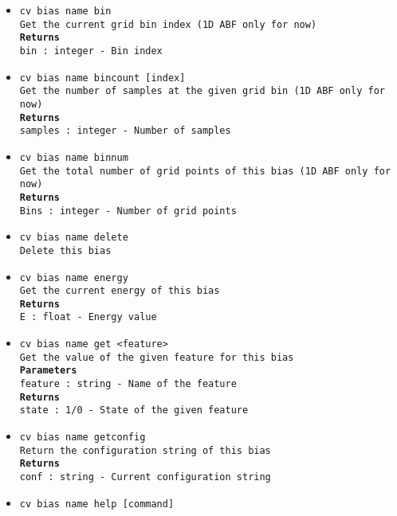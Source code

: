 \begin{itemize}
\item \texttt{cv bias name bin}
\\
\texttt{Get the current grid bin index (1D ABF only for now)}
\\
\texttt{\textbf{Returns}}
\\
\texttt{bin : integer - Bin index}
\item \texttt{cv bias name bincount [index]}
\\
\texttt{Get the number of samples at the given grid bin (1D ABF only for now)}
\\
\texttt{\textbf{Returns}}
\\
\texttt{samples : integer - Number of samples}
\item \texttt{cv bias name binnum}
\\
\texttt{Get the total number of grid points of this bias (1D ABF only for now)}
\\
\texttt{\textbf{Returns}}
\\
\texttt{Bins : integer - Number of grid points}
\item \texttt{cv bias name delete}
\\
\texttt{Delete this bias}
\item \texttt{cv bias name energy}
\\
\texttt{Get the current energy of this bias}
\\
\texttt{\textbf{Returns}}
\\
\texttt{E : float - Energy value}
\item \texttt{cv bias name get <feature>}
\\
\texttt{Get the value of the given feature for this bias}
\\
\texttt{\textbf{Parameters}}
\\
\texttt{feature : string - Name of the feature}
\\
\texttt{\textbf{Returns}}
\\
\texttt{state : 1/0 - State of the given feature}
\item \texttt{cv bias name getconfig}
\\
\texttt{Return the configuration string of this bias}
\\
\texttt{\textbf{Returns}}
\\
\texttt{conf : string - Current configuration string}
\item \texttt{cv bias name help [command]}
\\

\end{itemize}
